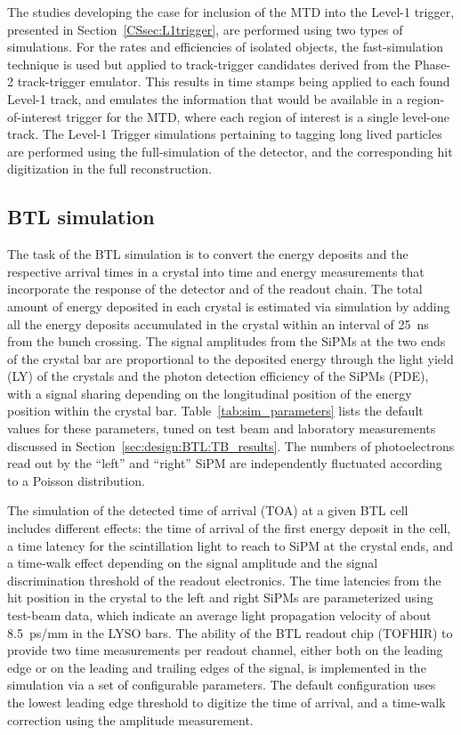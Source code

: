 The studies developing the case for inclusion of the MTD into the Level-1 trigger, presented in Section~\ref{CSsec:L1trigger}, are performed using two types of simulations.  
For the rates and efficiencies of isolated objects, the fast-simulation technique is used but applied to track-trigger candidates derived from the Phase-2 track-trigger emulator.
This results in time stamps being applied to each found Level-1 track, and emulates the information that would be available in a region-of-interest trigger for the MTD, where each region of interest is a single level-one track.
The Level-1 Trigger simulations pertaining to tagging long lived particles are performed using the full-simulation of the detector, and the corresponding hit digitization in the full reconstruction.

\subsection{BTL simulation}
\label{sec:btlsim}

The task of the BTL simulation is to convert the energy deposits and
the respective arrival times in a crystal into time and energy
measurements that incorporate the response of the detector
and of the readout chain. 
The total amount of energy deposited in each crystal is estimated via
\GEANT simulation by adding all the energy deposits accumulated in the
crystal within an interval of 25~ns from the bunch crossing. 
The signal amplitudes from the SiPMs at the two ends of the crystal
bar are proportional to the deposited energy through the light yield
(LY) of the crystals and the photon detection efficiency of the SiPMs
(PDE), with a signal sharing depending on the longitudinal position of
the energy position within the crystal bar. 
Table~\ref{tab:sim_parameters} lists the default values for these
parameters, tuned on test beam and laboratory measurements discussed
in Section~\ref{sec:design:BTL:TB_results}.   
The numbers of photoelectrons read out by the ``left'' and ``right'' SiPM are
independently fluctuated according to a Poisson distribution. 

The simulation of the detected time of arrival (TOA) at a given BTL
cell includes different effects: the time of arrival of the first
energy deposit in the cell, a time latency for the scintillation light
to reach to SiPM at the crystal ends, and a time-walk effect depending
on the signal amplitude and the signal discrimination threshold of the
readout electronics. The time latencies from the hit position in the
crystal to the left and right SiPMs are parameterized using
test-beam data, which indicate an average light propagation velocity
of about 8.5~ps/mm in the LYSO bars.  
%
The ability of the BTL readout chip (TOFHIR) to provide two time
measurements per readout channel, either both on the leading edge or
on the leading and trailing edges of the signal, is implemented in the
simulation via a set of configurable parameters. The default
configuration uses the lowest leading edge threshold to digitize the
time of arrival, and a time-walk correction using the amplitude
measurement. 
% 

